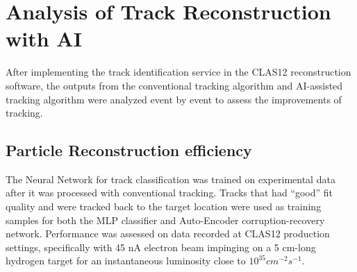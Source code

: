 \section{Analysis of Track Reconstruction with AI}

After implementing the track identification service in the CLAS12 reconstruction software, the outputs
from the conventional tracking algorithm and AI-assisted tracking algorithm were analyzed
event by event to assess the improvements of tracking. 
 
 \subsection{Particle Reconstruction efficiency}
 
 The Neural Network for track classification was trained on experimental data after it was processed with conventional tracking. Tracks that had ``good'' fit quality and were tracked back to the target location were used as training samples for both 
 the MLP classifier and Auto-Encoder corruption-recovery network. 
 Performance was assessed on data recorded at CLAS12 production settings, specifically with 45 nA electron beam impinging on a 5 cm-long hydrogen target for an instantaneous luminosity close to $10^{35} cm^{-2} s^{-1}$.
 
